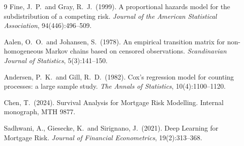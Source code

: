 \documentclass[11pt,a4paper]{article}
\begin{document}
\begin{thebibliography}{9}
  Fine, J.\ P.\ and Gray, R.\ J.\ (1999).
  A proportional hazards model for the subdistribution of a competing risk.
  \textit{Journal of the American Statistical Association}, 94(446):496--509.

  Aalen, O.\ O.\ and Johansen, S.\ (1978).
  An empirical transition matrix for non-homogeneous Markov chains based
  on censored observations.
  \textit{Scandinavian Journal of Statistics}, 5(3):141--150.

  Andersen, P.\ K.\ and Gill, R.\ D.\ (1982).
  Cox's regression model for counting processes: a large sample study.
  \textit{The Annals of Statistics}, 10(4):1100--1120.

  Chen, T.\ (2024).
  Survival Analysis for Mortgage Risk Modelling.
  Internal monograph, MTH 9877.

  Sadhwani, A., Giesecke, K.\ and Sirignano, J.\ (2021).
  Deep Learning for Mortgage Risk.
  \textit{Journal of Financial Econometrics}, 19(2):313--368.
\end{thebibliography}
\end{document}
